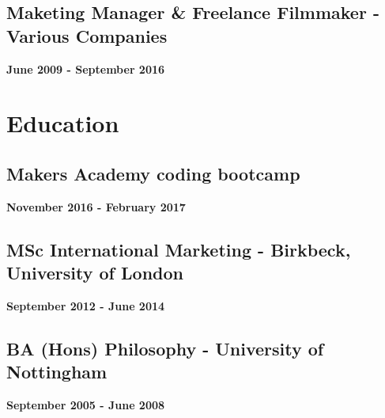 \documentclass[a4paper]{scrartcl}
\begin{document}
\subsection*{Maketing Manager \& Freelance Filmmaker - Various Companies}
\textbf{June 2009 - September 2016}

\section*{Education}

\subsection*{Makers Academy coding bootcamp}
\textbf{November 2016 - February 2017}

\subsection*{MSc International Marketing - Birkbeck, University of London}
\textbf{September 2012 - June 2014}

\subsection*{BA (Hons) Philosophy - University of Nottingham}
\textbf{September 2005 - June 2008}
\end{document}
